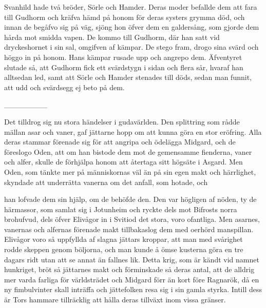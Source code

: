 Svanhild hade två bröder, Sörle och Hamder. Deras moder befallde dem att
fara till Gudhorm och kräfva hämd på honom för deras systers grymma död,
och innan de begåfvo sig på väg, sjöng hon öfver dem en galdersång, som
gjorde dem hårda mot smidda vapen. De kommo till Gudhorm, där han satt
vid dryckeshornet i sin sal, omgifven af kämpar. De stego fram, drogo
sina svärd och höggo in på honom. Hans kämpar rusade upp och angrepo
dem. Äfventyret slutade så, att Gudhorm fick ett svärdstygn i sidan och
flera sår, hvaraf han alltsedan led, samt att Sörle och Hamder stenades
till döds, sedan man funnit, att udd och svärdsegg ej beto på dem.

{\_\_\_\_\_\_\_\_}

Det tilldrog sig nu stora händelser i gudavärlden. Den splittring som
rådde mällan asar och vaner, gaf jättarne hopp om att kunna göra en stor
eröfring. Alla deras stammar förenade sig för att angripa och ödelägga
Midgard, och de föreslogo Oden, att om han bistode dem mot de gemensamme
fienderna, vaner och alfer, skulle de förhjälpa honom att återtaga sitt
högsäte i Asgard. Men Oden, som tänkte mer på människornas väl än på sin
egen makt och härrlighet, skyndade att underrätta vanerna om det anfall,
som hotade, och

han lofvade dem sin hjälp, om de behöfde den. Den var högligen af nöden,
ty de härmassor, som samlat sig i Jotunheim och ryckte dels mot Bifrosts
norra brohufvud, dels öfver Elivågor in i Svitiod det stora, voro
ofantliga. Men asarnes, vanernas och alfernas förenade makt tillbakaslog
dem med oerhörd manspillan. Elivågor voro så uppfyllda af slagna jättars
kroppar, att man med svårighet rodde skeppen genom böljorna, och man
kunde å ömse kusterna göra en tre dagars ridt utan att se annat än
fallnes lik. Detta krig, som är kändt vid namnet hunkriget, bröt så
jättarnes makt och förminskade så deras antal, att de alldrig mer varda
farliga för världsträdet och Midgard förr än kort före Ragnarök, då en
ny fimbulvinter skall inträffa och jättefolken resa sig i sin gamla
styrka. Intill dess är Tors hammare tillräcklig att hålla deras tillväxt
inom vissa gränser.

